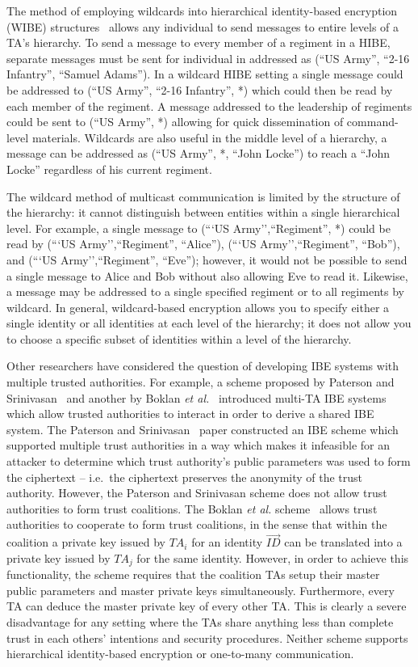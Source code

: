 \documentclass[10pt]{llncs}
\newcommand{\ID}{\mathit{ID}}
\newcommand{\TA}{\mathit{TA}}
\begin{document}
The method of employing wildcards into hierarchical identity-based
encryption (WIBE) structures~\cite{Abdalla06} allows any individual
to send messages to entire levels of a TA's hierarchy. To send a
message to every member of a regiment in a HIBE, separate messages
must be sent for individual in addressed as (``US Army'', ``2-16
Infantry'', ``Samuel Adams''). In a wildcard HIBE setting a single
message could be addressed to (``US Army'', ``2-16 Infantry'', *)
which could then be read by each member of the regiment. A message
addressed to the leadership of regiments could be sent to (``US
Army'', *) allowing for quick dissemination of command-level
materials. Wildcards are also useful in the middle level of a
hierarchy, a message can be addressed as (``US Army'', *, ``John
Locke'') to reach a ``John Locke'' regardless of his current
regiment.

The wildcard method of multicast communication is limited by the
structure of the hierarchy: it cannot distinguish between entities
within a single hierarchical level.  For example, a single message
to (```US Army'',``Regiment'', *) could be read by (```US
Army'',``Regiment'', ``Alice''), (```US Army'',``Regiment'',
``Bob''), and (```US Army'',``Regiment'', ``Eve''); however, it
would not be possible to send a single message to Alice and Bob
without also allowing Eve to read it. Likewise, a message may be
addressed to a single specified regiment or to all regiments by
wildcard. In general, wildcard-based encryption allows you to
specify either a single identity or all identities at each level of
the hierarchy; it does not allow you to choose a specific subset of
identities within a level of the hierarchy.

Other researchers have considered the question of developing IBE
systems with multiple trusted authorities. For example, a scheme
proposed by Paterson and Srinivasan~\cite{Paterson08} and another by
Boklan \emph{et al.}~\cite{Boklan08} introduced multi-TA IBE systems
which allow trusted authorities to interact in order to derive a
shared IBE system. The Paterson and Srinivasan~\cite{Paterson08}
paper constructed an IBE scheme which supported multiple trust
authorities in a way which makes it infeasible for an attacker to
determine which trust authority's public parameters was used to form
the ciphertext -- i.e.\ the ciphertext preserves the anonymity of
the trust authority. However, the Paterson and Srinivasan scheme
does not allow trust authorities to form trust coalitions. The
Boklan \emph{et al.} scheme~\cite{Boklan08} allows trust authorities
to cooperate to form trust coalitions, in the sense that within the
coalition a private key issued by $\TA_i$ for an identity
$\vec{\ID}$ can be translated into a private key issued by $\TA_j$
for the same identity. However, in order to achieve this
functionality, the scheme requires that the coalition TAs setup
their master public parameters and master private keys
simultaneously. Furthermore, every TA can deduce the master private
key of every other TA. This is clearly a severe disadvantage for any
setting where the TAs share anything less than complete trust in
each others' intentions and security procedures. Neither scheme
supports hierarchical identity-based encryption or one-to-many
communication.
\end{document}
